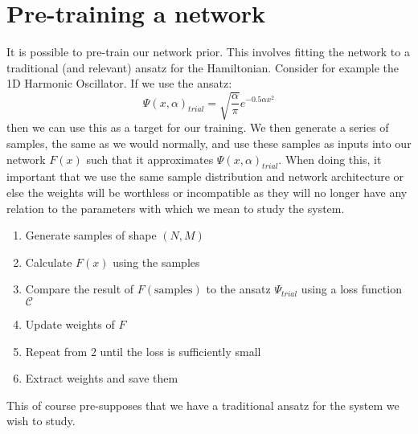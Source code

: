 \documentclass[12pt]{article}
\begin{document}
{\section{Pre-training a network}
It is possible to pre-train our network prior. This involves fitting the network to a traditional (and relevant) ansatz for the Hamiltonian. \newline 
Consider for example the 1D Harmonic Oscillator. If we use the ansatz:
\begin{equation*}
    \Psi(x, \alpha)_{trial} = \sqrt{\frac{\alpha}{\pi}} e^{-0.5\alpha x^2}
\end{equation*}
then we can use this as a target for our training. \newline
We then generate a series of samples, the same as we would normally, and use these samples as inputs into our network $F(x)$ such that it approximates $\Psi(x, \alpha)_{trial}$. When doing this, it important that we use the same sample distribution and network architecture or else the weights will be worthless or incompatible as they will no longer have any relation to the parameters with which we mean to study the system.
\begin{enumerate}
    \item Generate samples of shape $(N, M)$
    \item Calculate $F(x)$ using the samples
    \item Compare the result of $F(\text{samples})$ to the ansatz $\Psi_{trial}$ using a loss function $\mathcal{C}$
    \item Update weights of $F$
    \item Repeat from 2 until the loss is sufficiently small
    \item Extract weights and save them
\end{enumerate}
This of course pre-supposes that we have a traditional ansatz for the system we wish to study. 
\newpage
}
\end{document}
